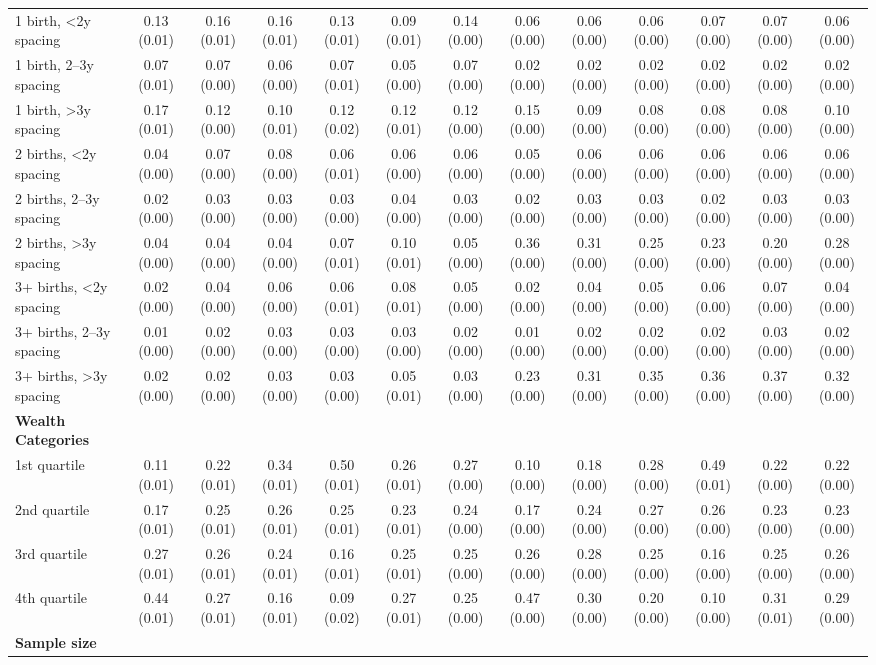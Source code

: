 \begin{tabular}{l*{12}{c}}
1 birth, \textless{}2y spacing&0.13 (0.01)&0.16 (0.01)&0.16 (0.01)&0.13 (0.01)&0.09 (0.01)&0.14 (0.00)&0.06 (0.00)&0.06 (0.00)&0.06 (0.00)&0.07 (0.00)&0.07 (0.00)&0.06 (0.00)\\
1 birth, 2–3y spacing&0.07 (0.01)&0.07 (0.00)&0.06 (0.00)&0.07 (0.01)&0.05 (0.00)&0.07 (0.00)&0.02 (0.00)&0.02 (0.00)&0.02 (0.00)&0.02 (0.00)&0.02 (0.00)&0.02 (0.00)\\
1 birth, \textgreater{}3y spacing&0.17 (0.01)&0.12 (0.00)&0.10 (0.01)&0.12 (0.02)&0.12 (0.01)&0.12 (0.00)&0.15 (0.00)&0.09 (0.00)&0.08 (0.00)&0.08 (0.00)&0.08 (0.00)&0.10 (0.00)\\
2 births, \textless{}2y spacing&0.04 (0.00)&0.07 (0.00)&0.08 (0.00)&0.06 (0.01)&0.06 (0.00)&0.06 (0.00)&0.05 (0.00)&0.06 (0.00)&0.06 (0.00)&0.06 (0.00)&0.06 (0.00)&0.06 (0.00)\\
2 births, 2–3y spacing&0.02 (0.00)&0.03 (0.00)&0.03 (0.00)&0.03 (0.00)&0.04 (0.00)&0.03 (0.00)&0.02 (0.00)&0.03 (0.00)&0.03 (0.00)&0.02 (0.00)&0.03 (0.00)&0.03 (0.00)\\
2 births, \textgreater{}3y spacing&0.04 (0.00)&0.04 (0.00)&0.04 (0.00)&0.07 (0.01)&0.10 (0.01)&0.05 (0.00)&0.36 (0.00)&0.31 (0.00)&0.25 (0.00)&0.23 (0.00)&0.20 (0.00)&0.28 (0.00)\\
3+ births, \textless{}2y spacing&0.02 (0.00)&0.04 (0.00)&0.06 (0.00)&0.06 (0.01)&0.08 (0.01)&0.05 (0.00)&0.02 (0.00)&0.04 (0.00)&0.05 (0.00)&0.06 (0.00)&0.07 (0.00)&0.04 (0.00)\\
3+ births, 2–3y spacing&0.01 (0.00)&0.02 (0.00)&0.03 (0.00)&0.03 (0.00)&0.03 (0.00)&0.02 (0.00)&0.01 (0.00)&0.02 (0.00)&0.02 (0.00)&0.02 (0.00)&0.03 (0.00)&0.02 (0.00)\\
3+ births, \textgreater{}3y spacing&0.02 (0.00)&0.02 (0.00)&0.03 (0.00)&0.03 (0.00)&0.05 (0.01)&0.03 (0.00)&0.23 (0.00)&0.31 (0.00)&0.35 (0.00)&0.36 (0.00)&0.37 (0.00)&0.32 (0.00)\\
\textbf{Wealth Categories}&&&&&&&&&&&&\\
1st quartile&0.11 (0.01)&0.22 (0.01)&0.34 (0.01)&0.50 (0.01)&0.26 (0.01)&0.27 (0.00)&0.10 (0.00)&0.18 (0.00)&0.28 (0.00)&0.49 (0.01)&0.22 (0.00)&0.22 (0.00)\\
2nd quartile&0.17 (0.01)&0.25 (0.01)&0.26 (0.01)&0.25 (0.01)&0.23 (0.01)&0.24 (0.00)&0.17 (0.00)&0.24 (0.00)&0.27 (0.00)&0.26 (0.00)&0.23 (0.00)&0.23 (0.00)\\
3rd quartile&0.27 (0.01)&0.26 (0.01)&0.24 (0.01)&0.16 (0.01)&0.25 (0.01)&0.25 (0.00)&0.26 (0.00)&0.28 (0.00)&0.25 (0.00)&0.16 (0.00)&0.25 (0.00)&0.26 (0.00)\\
4th quartile&0.44 (0.01)&0.27 (0.01)&0.16 (0.01)&0.09 (0.02)&0.27 (0.01)&0.25 (0.00)&0.47 (0.00)&0.30 (0.00)&0.20 (0.00)&0.10 (0.00)&0.31 (0.01)&0.29 (0.00)\\
\textbf{Sample size}&&&&&&&&&&&&\\
\bottomrule
\end{tabular}
